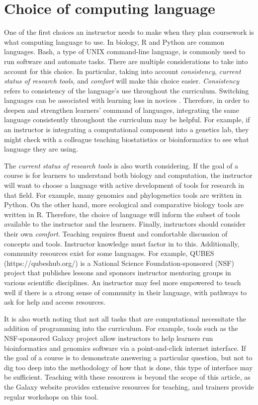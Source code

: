 \section{Choice of computing language}

One of the first choices an instructor needs to make when they plan coursework is what computing language to use.
In biology, R and Python are common languages.
Bash, a type of UNIX command-line language, is commonly used to run software and automate tasks.
There are multiple considerations to take into account for this choice.
In particular, taking into account \textit{consistency}, \textit{current status of research tools}, and \textit{comfort} will make this choice easier.
\textit{Consistency} refers to consistency of the language's use throughout the curriculum.
Switching languages can be associated with learning loss in novices \citep{wu1990}.
Therefore, in order to deepen and strengthen learners' command of languages, integrating the same language consistently throughout the curriculum may be helpful.
For example, if an instructor is integrating a computational component into a genetics lab, they might check with a colleague teaching biostatistics or bioinformatics to see what language they are using.


The \textit{current status of research tools} is also worth considering. 
If the goal of a course is for learners to understand both biology and computation, the instructor will want to choose a language with active development of tools for research in that field.
For example, many genomics and phylogenetics tools are written in Python. 
On the other hand, more ecological and comparative biology tools are written in R.
Therefore, the choice of language will inform the subset of tools available to the instructor and the learners.
Finally, instructors should consider their own \textit{comfort}. 
Teaching requires fluent and comfortable discussion of concepts and tools.
Instructor knowledge must factor in to this.
Additionally, community resources exist for some languages. 
For example, QUBES (https://qubeshub.org/) is a National Science Foundation-sponsored (NSF) project that publishes lessons and sponsors instructor mentoring groups in various scientific disciplines.
An instructor may feel more empowered to teach well if there is a strong sense of community in their language, with pathways to ask for help and access resources.

It is also worth noting that not all tasks that are computational necessitate the addition of programming into the curriculum.
For example, tools such as the NSF-sponsored Galaxy project allow instructors to help learners run bioinformatics and genomics software via a point-and-click internet interface.
If the goal of a course is to demonstrate answering a particular question, but not to dig too deep into the methodology of how that is done, this type of interface may be sufficient.
Teaching with these resources is beyond the scope of this article, as
the Galaxy website provides extensive resources for teaching,
and trainers provide regular workshops on this tool.

